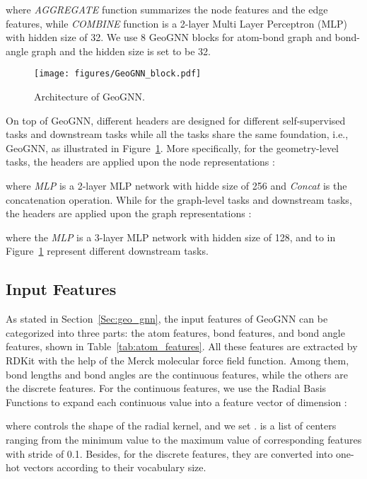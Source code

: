 \documentclass{article}
\begin{document}
where \textit{AGGREGATE} function summarizes the node features and the edge features, while \textit{COMBINE} function is a 2-layer Multi Layer Perceptron (MLP) with hidden size of 32. We use 8 GeoGNN blocks for atom-bond graph and bond-angle graph and the hidden size is set to be 32.

\begin{figure}[h]
\centering
  \texttt{[image: figures/GeoGNN\_block.pdf]}
  
\caption{Architecture of GeoGNN.}
\label{fig:geognn_block}
\end{figure}

On top of GeoGNN, different headers are designed for different self-supervised tasks and downstream tasks while all the tasks share the same foundation, i.e., GeoGNN, as illustrated in Figure~\ref{fig:geognn_block}. More specifically, for the geometry-level tasks, the headers are applied upon the node representations :
 
where \textit{MLP} is a 2-layer MLP network with hidde size of 256 and \textit{Concat} is the concatenation operation. While for the graph-level tasks and downstream tasks, the headers are applied upon the graph representations :

where the \textit{MLP} is a 3-layer MLP network with hidden size of 128, and  to   in Figure~\ref{fig:geognn_block} represent  different downstream tasks.



\subsection{Input Features}

As stated in Section~\ref{Sec:geo_gnn}, the input features of GeoGNN can be categorized into three parts: the atom features, bond features, and bond angle features, shown in Table~\ref{tab:atom_features}. All these features are extracted by RDKit \cite{landrum2006rdkit} with the help of the Merck molecular force field function. Among them, bond lengths and bond angles are the continuous features, while the others are the discrete features. For the continuous features, we use the Radial Basis Functions \cite{buhmann2003radial} to expand each continuous value  into a feature vector  of dimension :

where  controls the shape of the radial kernel, and we set .  is a list of centers ranging from the minimum value to the maximum value of corresponding features with stride of 0.1. Besides, for the discrete features, they are converted into one-hot vectors according to their vocabulary size.
\end{document}
